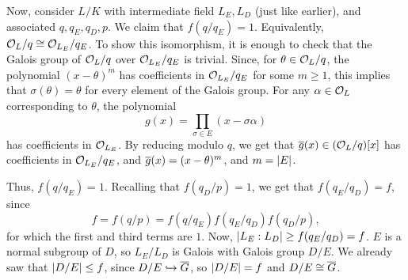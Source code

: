 \newpage
Now, consider $L/K$ with intermediate field $L_E, L_D$ (just like earlier), and associated $q, q_E, q_D, p$. We claim that $f(q/q_E) = 1$. Equivalently, $\mathcal O_L/q \cong \mathcal O_{L_E}/q_E$. To show this isomorphism, it is enough to check that the Galois group of $\mathcal O_L/q$ over $\mathcal O_{L_E}/q_E$ is trivial. Since, for $\theta \in \mathcal O_L/q$, the polynomial $(x - \theta)^m$ has coefficients in $\mathcal O_{L_E} / q_E$ for some $m \geq 1$, this implies that $\sigma(\theta) = \theta$ for every element of the Galois group. For any $\alpha \in \mathcal O_L$ corresponding to $\theta$, the polynomial
\[ g(x) = \prod_{\sigma \in E} (x - \sigma \alpha) \]
has coefficients in $\mathcal O_{L_E}$. By reducing modulo $q$, we get that $\overline g(x) \in (\mathcal O_L / q)[x]$ has coefficients in $\mathcal O_{L_E} / q_E$, and $\overline g(x) = (x - \theta)^m$, and $m = \left\lvert E \right\rvert$.

Thus, $f(q / q_E) = 1$. Recalling that $f(q_D/p) = 1$, we get that $f(q_E/q_D) = f$, since
\[ f = f(q/p) = f(q/q_E) f(q_E/q_D) f(q_D/p), \]
for which the first and third terms are $1$. Now, $\left\lvert L_E : L_D \right\rvert \geq f(q_E/q_D) = f$. $E$ is a normal subgroup of $D$, so $L_E/L_D$ is Galois with Galois group $D/E$. We already saw that $\left\lvert D/E \right\rvert \leq f$, since $D/E \hookrightarrow \overline G$, so $\left\lvert D/E \right\rvert = f$ and $D/E \cong \overline G$.